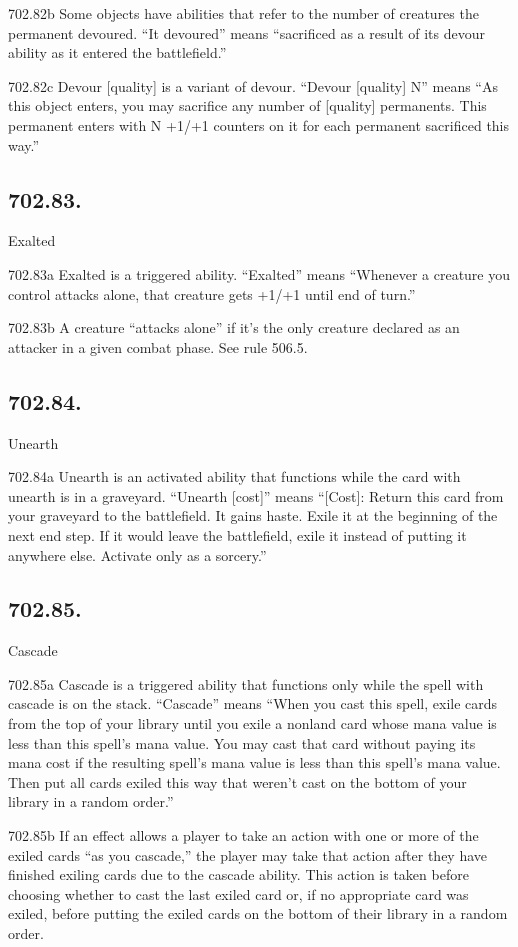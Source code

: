702.82b Some objects have abilities that refer to the number of creatures the permanent devoured. “It devoured” means “sacrificed as a result of its devour ability as it entered the battlefield.”

702.82c Devour [quality] is a variant of devour. “Devour [quality] N” means “As this object enters, you may sacrifice any number of [quality] permanents. This permanent enters with N +1/+1 counters on it for each permanent sacrificed this way.”

\subsection*{702.83.}
Exalted

702.83a Exalted is a triggered ability. “Exalted” means “Whenever a creature you control attacks alone, that creature gets +1/+1 until end of turn.”

702.83b A creature “attacks alone” if it’s the only creature declared as an attacker in a given combat phase. See rule 506.5.

\subsection*{702.84.}
Unearth

702.84a Unearth is an activated ability that functions while the card with unearth is in a graveyard. “Unearth [cost]” means “[Cost]: Return this card from your graveyard to the battlefield. It gains haste. Exile it at the beginning of the next end step. If it would leave the battlefield, exile it instead of putting it anywhere else. Activate only as a sorcery.”

\subsection*{702.85.}
Cascade

702.85a Cascade is a triggered ability that functions only while the spell with cascade is on the stack. “Cascade” means “When you cast this spell, exile cards from the top of your library until you exile a nonland card whose mana value is less than this spell’s mana value. You may cast that card without paying its mana cost if the resulting spell’s mana value is less than this spell’s mana value. Then put all cards exiled this way that weren’t cast on the bottom of your library in a random order.”

702.85b If an effect allows a player to take an action with one or more of the exiled cards “as you cascade,” the player may take that action after they have finished exiling cards due to the cascade ability. This action is taken before choosing whether to cast the last exiled card or, if no appropriate card was exiled, before putting the exiled cards on the bottom of their library in a random order.

